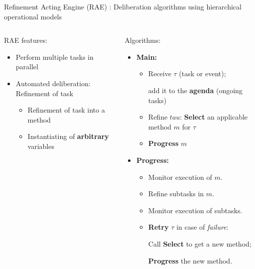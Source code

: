 \begin{frame}{Refinement Acting Engine (RAE)\cite{ghallabAutomatedPlanningActing2016} : Deliberation algorithms using hierarchical operational models}
\begin{columns}
    \begin{column}{0.35\textwidth}
    \pause
    \setlength{\leftmargini}{-1pt}
    RAE features:
    \small
    \begin{itemize}
        \item Perform multiple tasks in parallel
        \pause
        \item Automated deliberation: Refinement of task
        \begin{itemize}
            \setlength{\leftmargini}{-1pt}
            \pause
            \item Refinement of task into a method
            \pause
            \item Instantiating of \textbf{arbitrary} variables
        \end{itemize}
    \end{itemize}
    \end{column}
    \begin{column}{0.65\textwidth}
        Algorithms:
        \small
        \begin{itemize}
            \setlength{\leftmargini}{-1pt}
            \item \textbf{Main:} 
            \begin{itemize}
                \item Receive $\tau$ (task or event);
                
                add it to the \textbf{agenda} (ongoing tasks)
                \pause
                \item Refine $tau$: \textbf{Select} an applicable method $m$ for $\tau$
                \pause
                \item \textbf{Progress} $m$
            \end{itemize}
            \item \textbf{Progress:}
                \begin{itemize}
                \item Monitor execution of $m$.
                \item Refine subtasks in $m$.    
                \item Monitor execution of subtasks.
                \item \textbf{Retry} $\tau$ in case of \emph{failure}:
                
                Call \textbf{Select} to get a new method;
                
                \textbf{Progress} the new method.
                \end{itemize}
                \pause
        \end{itemize}
    \end{column}
\end{columns}

    
\end{frame}


